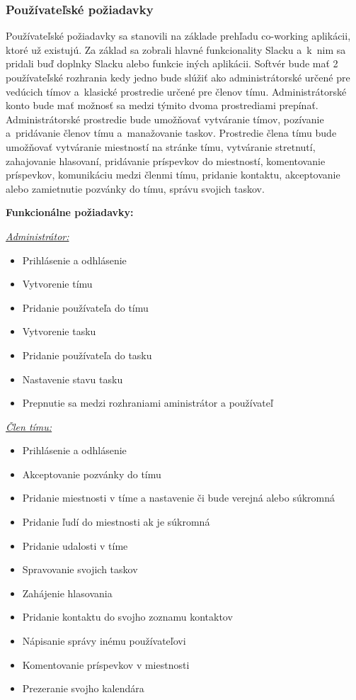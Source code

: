 \subsubsection{Používateľské požiadavky} 
\indent Používateľské požiadavky sa stanovili na základe prehľadu co-working aplikácii, ktoré už existujú. Za základ sa zobrali hlavné funkcionality Slacku a k nim sa pridali buď doplnky Slacku alebo funkcie iných aplikácii. Softvér bude mať 2 používateľské rozhrania kedy jedno bude slúžiť ako administrátorské určené pre vedúcich tímov a klasické prostredie určené pre členov tímu. Administrátorské konto bude mať možnosť sa medzi týmito dvoma prostrediami prepínať. Administrátorské prostredie bude umožňovať vytváranie tímov, pozívanie a pridávanie členov tímu a manažovanie taskov. Prostredie člena tímu bude umožňovať vytváranie miestností na stránke tímu, vytváranie stretnutí, zahajovanie hlasovaní, pridávanie príspevkov do miestností, komentovanie príspevkov, komunikáciu medzi členmi tímu, pridanie kontaktu, akceptovanie alebo zamietnutie pozvánky do tímu, správu svojich taskov.

\textbf{Funkcionálne požiadavky:}

\underline{\textit{Administrátor:}}
\indent\begin{itemize}
    \item Prihlásenie a odhlásenie
    \item Vytvorenie tímu
    \item Pridanie používateľa do tímu
    \item Vytvorenie tasku
    \item Pridanie používateľa do tasku
    \item Nastavenie stavu tasku
    \item Prepnutie sa medzi rozhraniami aministrátor a používateľ
\end{itemize}


\underline{\textit{Člen tímu:}}
\indent\begin{itemize}
    \item Prihlásenie a odhlásenie
    \item Akceptovanie pozvánky do tímu
    \item Pridanie miestnosti v tíme a nastavenie či bude verejná alebo súkromná
    \item Pridanie ľudí do miestnosti ak je súkromná
    \item Pridanie udalosti v tíme
    \item Spravovanie svojich taskov
    \item Zahájenie hlasovania
    \item Pridanie kontaktu do svojho zoznamu kontaktov
    \item Nápisanie správy inému používateľovi
    \item Komentovanie príspevkov v miestnosti
    \item Prezeranie svojho kalendára\newline
\end{itemize}


